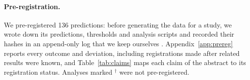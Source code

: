 \paragraph{Pre-registration.} We pre-registered 136 predictions: before generating the data for a study, we wrote down its predictions, thresholds and analysis scripts and recorded their hashes in an append-only log that we keep ourselves \citep{vanmiltenburg2021preregistering}. Appendix~\ref{app:prereg} reports every outcome and deviation, including registrations made after related results were known, and Table~\ref{tab:claims} maps each claim of the abstract to its registration status. Analyses marked $^{\dagger}$ were not pre-registered.
